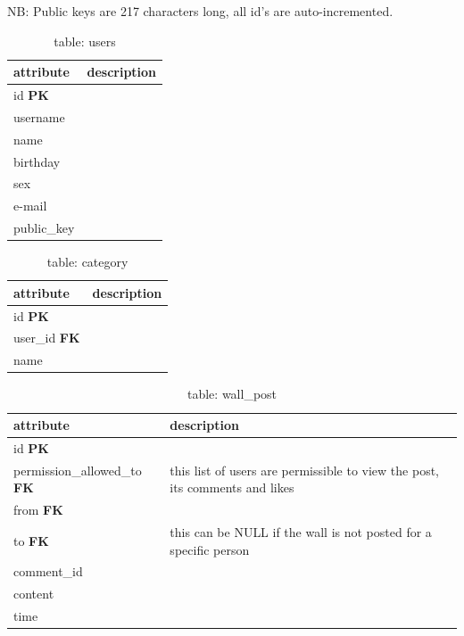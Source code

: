 NB: Public keys are 217 characters long, all id's are auto-incremented.

\begin{table}[h]
    \centering
    \begin{tabular}{ll}
    attribute      & description\\ \hline
    id \textbf{PK} & \\
    username       & \\
    name           & \\
    birthday       & \\
    sex            & \\
    e-mail         & \\
    public\_key    & \\
    \end{tabular}
    \caption{table: users}
\end{table}

\begin{table}[h]
    \centering
    \begin{tabular}{ll}
    attribute            & description\\ \hline
    id \textbf{PK}       & \\
    user\_id \textbf{FK} & \\
    name                 & \\
    \end{tabular}
    \caption{table: category}
\end{table}

\begin{table}[h]
    \centering
    \begin{tabular}{ll}
    attribute                           & description\\ \hline
    id \textbf{PK}                       & \\
    permission\_allowed\_to \textbf{FK} & this list of users are permissible to view the post, its comments and likes\\
    from \textbf{FK}                    & \\
    to \textbf{FK}                      & this can be NULL if the wall is not posted for a specific person\\
    comment\_id                         & \\
    content                             & \\
    time                                & \\
    \end{tabular}
    \caption{table: wall\_post}
\end{table}

